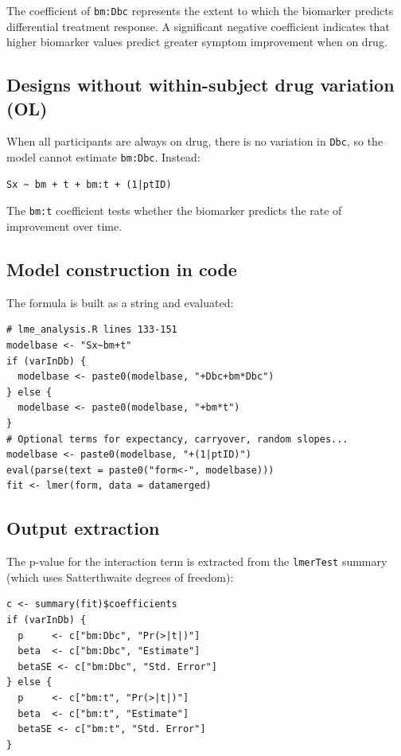 \documentclass[11pt]{article}
\begin{document}
The coefficient of \texttt{bm:Dbc} represents the extent to which the
biomarker predicts differential treatment response. A significant
negative coefficient indicates that higher biomarker values
predict greater symptom improvement when on drug.

\subsection{Designs without within-subject drug variation (OL)}

When all participants are always on drug, there is no variation
in \texttt{Dbc}, so the model cannot estimate \texttt{bm:Dbc}. Instead:

\begin{verbatim}
Sx ~ bm + t + bm:t + (1|ptID)
\end{verbatim}

The \texttt{bm:t} coefficient tests whether the biomarker predicts the
rate of improvement over time.

\subsection{Model construction in code}

The formula is built as a string and evaluated:

\begin{lstlisting}
# lme_analysis.R lines 133-151
modelbase <- "Sx~bm+t"
if (varInDb) {
  modelbase <- paste0(modelbase, "+Dbc+bm*Dbc")
} else {
  modelbase <- paste0(modelbase, "+bm*t")
}
# Optional terms for expectancy, carryover, random slopes...
modelbase <- paste0(modelbase, "+(1|ptID)")
eval(parse(text = paste0("form<-", modelbase)))
fit <- lmer(form, data = datamerged)
\end{lstlisting}

\subsection{Output extraction}

The p-value for the interaction term is extracted from the
\texttt{lmerTest} summary (which uses Satterthwaite degrees of freedom):

\begin{lstlisting}
c <- summary(fit)$coefficients
if (varInDb) {
  p     <- c["bm:Dbc", "Pr(>|t|)"]
  beta  <- c["bm:Dbc", "Estimate"]
  betaSE <- c["bm:Dbc", "Std. Error"]
} else {
  p     <- c["bm:t", "Pr(>|t|)"]
  beta  <- c["bm:t", "Estimate"]
  betaSE <- c["bm:t", "Std. Error"]
}
\end{lstlisting}
\end{document}
